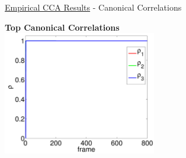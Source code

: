 \documentclass[8pt]{beamer}
\begin{document}
\begin{frame}{\href{run:/home/asendorf/Documents/thesis_videos/flashing_cca.mp4}{Empirical
      CCA Results} -
    Canonical Correlations}


    \begin{center}
      \textbf{Top Canonical Correlations }\\
      \includegraphics[width=0.5\textwidth]{figures/flashing_cca_corrs.pdf}
    \end{center}


\end{frame}
\end{document}

